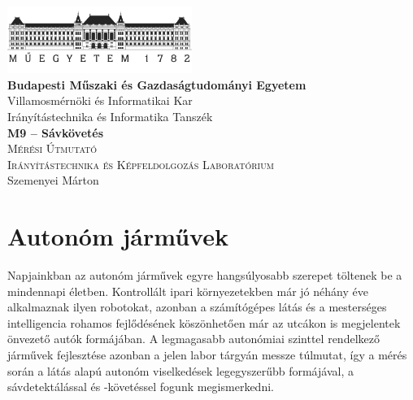 \documentclass[12pt,a4paper,oneside]{report}             %
\author{\vikauthor}
\title{\viktitle}
\newcommand{\vikauthor}{Szemenyei Márton}
\newcommand{\viktitle}{M9 – Sávkövetés}
\newcommand{\vikdept}{Irányítástechnika és Informatika Tanszék}
\newcommand{\vikdoktipus}{Irányítástechnika és Képfeldolgozás Laboratórium}
\newcommand{\viksubtitle}{Mérési Útmutató}
\newcommand{\hsp}{\hspace{20pt}}
\begin{document}
\onehalfspacing

\begin{titlepage}
\begin{center}
\includegraphics[width=60mm,keepaspectratio]{images/logo.png}\\
\vspace{0.3cm}
\textbf{Budapesti Műszaki és Gazdaságtudományi Egyetem}\\
\textmd{Villamosmérnöki és Informatikai Kar}\\
\textmd{\vikdept}\\[5cm]

\vspace{0.4cm}
{\huge \bfseries \viktitle}\\[2cm]
\textsc{\Large \viksubtitle}\\[1cm]
\textsc{\Large \vikdoktipus}\\[6cm]

\vfill
{\large \vikauthor}
\end{center}
\end{titlepage}


\singlespacing
\tableofcontents\thispagestyle{fancy}
\titleformat{\chapter}[hang]{\Huge\bfseries}{\thechapter\hsp}{0pt}{\Huge\bfseries}

\chapter{Autonóm járművek}

Napjainkban az autonóm járművek egyre hangsúlyosabb szerepet töltenek be a mindennapi életben. Kontrollált ipari környezetekben már jó néhány éve alkalmaznak ilyen robotokat, azonban a számítógépes látás és a mesterséges intelligencia rohamos fejlődésének köszönhetően már az utcákon is megjelentek önvezető autók formájában. A legmagasabb autonómiai szinttel rendelkező járművek fejlesztése azonban a jelen labor tárgyán messze túlmutat, így a mérés során a látás alapú autonóm viselkedések legegyszerűbb formájával, a sávdetektálással és -követéssel fogunk megismerkedni.
\end{document}
